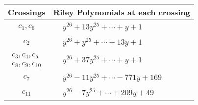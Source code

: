 \documentclass[1p]{elsarticle_modified}
\theoremstyle{definition}
\begin{document}
\begin{tabular}{m{50pt}|m{274pt}}
Crossings & \hspace{64pt}Riley Polynomials at each crossing \\
\hline $$\begin{aligned}c_{1},c_{6}\end{aligned}$$&$\begin{aligned}
&y^{26}+13 y^{25}+\cdots+y+1
\end{aligned}$\\
\hline $$\begin{aligned}c_{2}\end{aligned}$$&$\begin{aligned}
&y^{26}+y^{25}+\cdots+13 y+1
\end{aligned}$\\
\hline $$\begin{aligned}c_{3},c_{4},c_{5}\\c_{8},c_{9},c_{10}\end{aligned}$$&$\begin{aligned}
&y^{26}+37 y^{25}+\cdots+y+1
\end{aligned}$\\
\hline $$\begin{aligned}c_{7}\end{aligned}$$&$\begin{aligned}
&y^{26}-11 y^{25}+\cdots-771 y+169
\end{aligned}$\\
\hline $$\begin{aligned}c_{11}\end{aligned}$$&$\begin{aligned}
&y^{26}-7 y^{25}+\cdots+209 y+49
\end{aligned}$\\
\hline
\end{tabular}
\vskip 2pc
\end{document}
